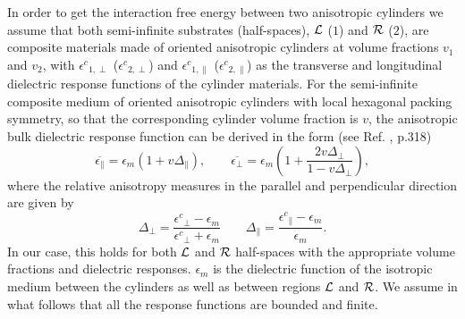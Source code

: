 \documentclass[onecolumn,letterpaper,amsmath,amssymb,floatfix,aps,superscriptaddress]{revtex4}
\begin{document}
In order to get the interaction free energy between two anisotropic cylinders we assume that both semi-infinite substrates (half-spaces), ${\cal L}$ ($1$) and ${\cal R}$ ($2$), are 
composite materials made of oriented anisotropic cylinders at volume fractions $v_1$ and $v_2$, with ${\epsilon^{c}}_{1,\perp}$ (${\epsilon^{c}}_{2,\perp}$) 
and ${\epsilon^{c}}_{1,\parallel}$ (${\epsilon^{c}}_{2,\parallel}$) as the transverse and longitudinal
dielectric response functions of the cylinder materials. For the semi-infinite composite medium of oriented anisotropic cylinders with local hexagonal  packing symmetry, so that the corresponding cylinder volume fraction is $v$, the anisotropic bulk dielectric response function can be derived in the
form (see Ref. , p.318) 
\begin{equation}
\overline{\epsilon_{\parallel}}=\epsilon_{m}\left(1+v\Delta_{\parallel}\right),\qquad\overline{\epsilon_{\perp}}=\epsilon_{m}\left(1+\frac{2v\Delta_{\perp}}{1-v\Delta_{\perp}}\right),\label{eq:v_dependance}
\end{equation}
where the relative anisotropy measures in the parallel and perpendicular direction are given by
\begin{equation}
\Delta_{\perp}=\frac{{\epsilon^{c}}_{\perp}-\epsilon_{m}}{{\epsilon^{c}}_{\perp}+\epsilon_{m}}\qquad\Delta_{\parallel}=\frac{{\epsilon^{c}}_{\parallel}-\epsilon_{m}}{\epsilon_{m}}.
\label{anisoind}
\end{equation}
In our case, this holds for both ${\cal L}$ and ${\cal R}$ half-spaces with the appropriate volume fractions and dielectric responses. $\epsilon_{m}$ is the dielectric function of the 
isotropic medium between the cylinders as well as between regions ${\cal L}$ and ${\cal R}$. We assume in what follows that all the response functions are bounded and finite.
 
\end{document}
